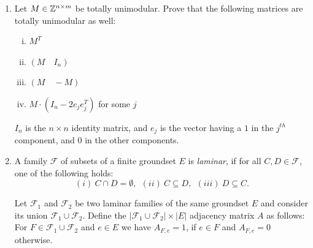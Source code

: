 \begin{enumerate}
\item 
Let $M\in \mathbb{Z}^{n\times m}$ be totally unimodular. Prove that the following matrices
are totally unimodular as well:
\begin{enumerate}[i)]
\item $M^T$
\item  $( M \quad I_n )$
\item $(M \quad -M)$
\item $M \cdot (I_n - 2 e_j e_j^T )$ for some $j$
\end{enumerate}\label{i:item:6}

$I_n$ is the $n\times n$ identity matrix, and
$e_j$ is the vector having a $1$ in the $j^{th}$ component, and $0$ in the other components.




\item 
A family $\mathcal{F}$ of subsets of a finite groundset $E$ is
\emph{laminar}, if for all  $C,D\in \mathcal{F}$, one of the following holds:
$$ (i)~C\cap D = \emptyset,~~(ii)~C \subseteq D,~~(iii)~D\subseteq C. $$

Let $\mathcal{F}_1$ and $\mathcal{F}_2$ be two laminar families of the same groundset $E$ and consider its union $\mathcal{F}_1\cup\mathcal{F}_2$.
Define the $|\mathcal{F}_1\cup\mathcal{F}_2|\times |E|$ adjacency matrix $A$ as follows:
For $F\in\mathcal{F}_1\cup\mathcal{F}_2$ and $e\in E$ we have
$A_{F,e}=1$, if $e\in F$ and $A_{F,e}=0$ otherwise.


\end{enumerate}

